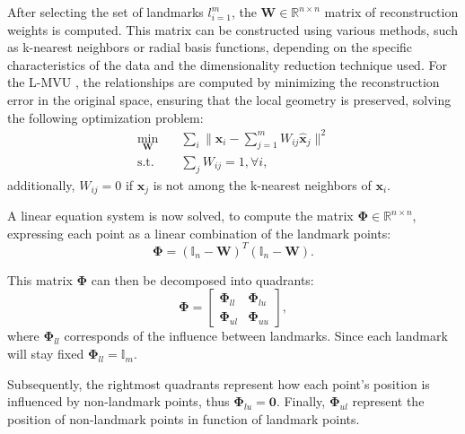             After selecting the set of landmarks ${l}_{i=1}^m$, the $\boldsymbol{W} \in \mathbb{R}^{n \times n}$ matrix of reconstruction weights is computed. This matrix can be constructed using various methods, such as k-nearest neighbors or radial basis functions, depending on the specific characteristics of the data and the dimensionality reduction technique used. For the \ac{L-MVU} \cite{landmark-mvu}, the relationships are computed by minimizing the reconstruction error in the original space, ensuring that the local geometry is preserved, solving the following optimization problem:
            \begin{align}
                \min_{\boldsymbol{W}} \quad & \sum_i {\| \boldsymbol{x}_i - \sum_{j=1}^{m} W_{ij} \boldsymbol{\hat{x}}_j \|^2} \\
                \textrm{s.t.} \quad
                & \sum_j W_{ij} = 1, \forall{i},
            \end{align}
            additionally, $W_{ij} = 0$ if $\boldsymbol{\hat{x}}_j$ is not among the k-nearest neighbors of $\boldsymbol{x}_i$.

            A linear equation system is now solved, to compute the matrix $\boldsymbol{\Phi} \in \mathbb{R}^{n \times n}$, expressing each point as a linear combination of the landmark points:
            \begin{equation}
                \boldsymbol{\Phi} = (\boldsymbol{\mathbb{I}}_n - \boldsymbol{W})^T (\boldsymbol{\mathbb{I}}_n - \boldsymbol{W}).
            \end{equation}

            This matrix $\boldsymbol{\Phi}$ can then be decomposed into quadrants:
            \begin{equation}
                \boldsymbol{\Phi} = 
                \begin{bmatrix}
                    \boldsymbol{\Phi}_{ll} & \boldsymbol{\Phi}_{lu} \\
                    \boldsymbol{\Phi}_{ul} & \boldsymbol{\Phi}_{uu}
                \end{bmatrix},
            \end{equation}
            where $\boldsymbol{\Phi}_{ll}$ corresponds of the influence between landmarks. Since each landmark will stay fixed $\boldsymbol{\Phi}_{ll} = \boldsymbol{\mathbb{I}}_m$.
            
            Subsequently, the rightmost quadrants represent how each point's position is influenced by non-landmark points, thus $\boldsymbol{\Phi}_{lu} = \boldsymbol{0}$. Finally, $\boldsymbol{\Phi}_{ul}$ represent the position of non-landmark points in function of landmark points.

